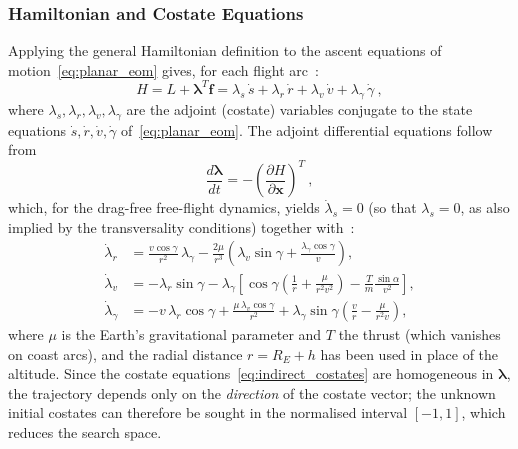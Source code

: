 \subsubsection{Hamiltonian and Costate Equations}

Applying the general Hamiltonian definition to the ascent equations of motion~\eqref{eq:planar_eom} gives, for each flight arc~\cite{BettsSurvey1998}:
\begin{equation}
H = L + \boldsymbol{\lambda}^{T}\mathbf{f}
  = \lambda_s\,\dot{s} + \lambda_r\,\dot{r} + \lambda_v\,\dot{v} + \lambda_\gamma\,\dot{\gamma} \ ,
\label{eq:indirect_hamiltonian}
\end{equation}
where $\lambda_s,\lambda_r,\lambda_v,\lambda_\gamma$ are the adjoint (costate) variables conjugate to the state equations $\dot{s},\dot{r},\dot{v},\dot{\gamma}$ of~\eqref{eq:planar_eom}. The adjoint differential equations follow from
\begin{equation}
\frac{d\boldsymbol{\lambda}}{dt} = -\left(\frac{\partial H}{\partial \mathbf{x}}\right)^{T} \ ,
\label{eq:indirect_adjoint}
\end{equation}
which, for the drag-free free-flight dynamics, yields $\dot{\lambda}_s = 0$ (so that $\lambda_s = 0$, as also implied by the transversality conditions) together with~\cite{pontryagin1987mathematical}:
\begin{subequations}\label{eq:indirect_costates}
\begin{align}
\dot{\lambda}_r &= \frac{v\cos\gamma}{r^{2}}\,\lambda_\gamma
  - \frac{2\mu}{r^{3}}\!\left(\lambda_v\sin\gamma + \frac{\lambda_\gamma\cos\gamma}{v}\right), \label{eq:costate_r}\\[4pt]
\dot{\lambda}_v &= -\lambda_r\sin\gamma
  - \lambda_\gamma\!\left[\cos\gamma\!\left(\frac{1}{r} + \frac{\mu}{r^{2}v^{2}}\right) - \frac{T}{m}\frac{\sin\alpha}{v^{2}}\right], \label{eq:costate_v}\\[4pt]
\dot{\lambda}_\gamma &= -v\,\lambda_r\cos\gamma
  + \frac{\mu\,\lambda_v\cos\gamma}{r^{2}}
  + \lambda_\gamma\sin\gamma\!\left(\frac{v}{r} - \frac{\mu}{r^{2}v}\right), \label{eq:costate_gamma}
\end{align}
\end{subequations}
where $\mu$ is the Earth's gravitational parameter and $T$ the thrust (which vanishes on coast arcs), and the radial distance $r = R_E + h$ has been used in place of the altitude. Since the costate equations~\eqref{eq:indirect_costates} are homogeneous in $\boldsymbol{\lambda}$, the trajectory depends only on the \emph{direction} of the costate vector; the unknown initial costates can therefore be sought in the normalised interval $[-1,1]$, which reduces the search space.

